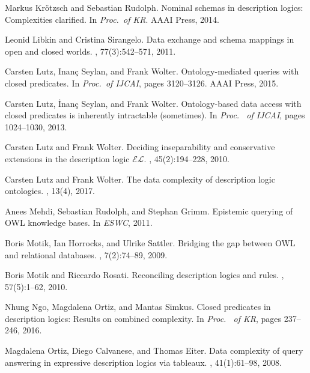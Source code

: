 \documentclass{lmcs}
\theoremstyle{definition}
\begin{document}
\begin{thebibliography}{10}
Markus Kr{\"{o}}tzsch and Sebastian Rudolph.
\newblock Nominal schemas in description logics: Complexities clarified.
\newblock In {\em Proc.\ of {KR}}. {AAAI} Press, 2014.

Leonid Libkin and Cristina Sirangelo.
\newblock Data exchange and schema mappings in open and closed worlds.
, 77(3):542--571, 2011.

Carsten Lutz, Inan{\c{c}} Seylan, and Frank Wolter.
\newblock Ontology-mediated queries with closed predicates.
\newblock In {\em Proc.\ of {IJCAI}}, pages 3120--3126. {AAAI} Press, 2015.

Carsten Lutz, \.{I}nan\c{c} Seylan, and Frank Wolter.
\newblock Ontology-based data access with closed predicates is inherently
  intractable (sometimes).
\newblock In {\em Proc. \ of {IJCAI}}, pages 1024--1030, 2013.

Carsten Lutz and Frank Wolter.
\newblock Deciding inseparability and conservative extensions in the
  description logic $\mathcal{EL}$.
, 45(2):194--228, 2010.

Carsten Lutz and Frank Wolter.
\newblock The data complexity of description logic ontologies.
, 13(4), 2017.

Anees Mehdi, Sebastian Rudolph, and Stephan Grimm.
\newblock Epistemic querying of {OWL} knowledge bases.
\newblock In {\em ESWC}, 2011.

Boris Motik, Ian Horrocks, and Ulrike Sattler.
\newblock Bridging the gap between {OWL} and relational databases.
, 7(2):74--89, 2009.

Boris Motik and Riccardo Rosati.
\newblock Reconciling description logics and rules.
, 57(5):1--62, 2010.

Nhung Ngo, Magdalena Ortiz, and Mantas Simkus.
\newblock Closed predicates in description logics: Results on combined
  complexity.
\newblock In {\em Proc. \ of {KR}}, pages 237--246, 2016.

Magdalena Ortiz, Diego Calvanese, and Thomas Eiter.
\newblock Data complexity of query answering in expressive description logics
  via tableaux.
, 41(1):61--98, 2008.


\end{thebibliography}
\end{document}
